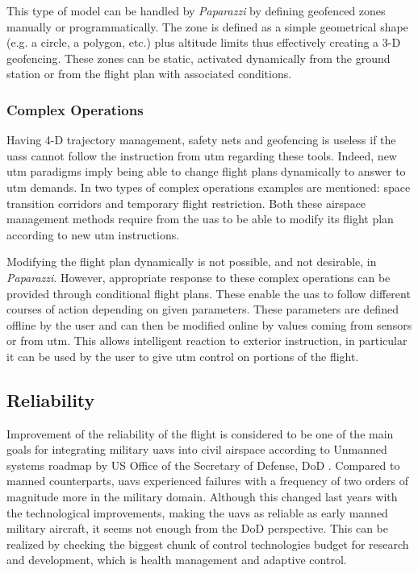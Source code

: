 		This type of model can be handled by \emph{Paparazzi} by defining geofenced zones manually or programmatically. The zone is defined as a simple geometrical shape (e.g. a circle, a polygon, etc.) plus altitude limits thus effectively creating a 3-D geofencing. 
		These zones can be static, activated dynamically from the ground station or from the flight plan with associated conditions.
	
	\subsubsection{Complex Operations}
		Having 4-D trajectory management, safety nets and geofencing is useless if the \gls{uas}s cannot follow the instruction from \gls{utm} regarding these tools.
		Indeed, new \gls{utm} paradigms imply being able to change flight plans dynamically to answer to \gls{utm} demands. In \cite{wargo_complex_2015} two types of complex operations examples are mentioned: space transition corridors and temporary flight restriction.
		Both these airspace management methods require from the \gls{uas} to be able to modify its flight plan according to new \gls{utm} instructions.
		
		Modifying the flight plan dynamically is not possible, and not desirable, in \emph{Paparazzi}. However, appropriate response to these complex operations can be provided through conditional flight plans. These enable the \gls{uas} to follow different courses of action depending on given parameters. These parameters are defined offline by the user and can then be modified online by values coming from sensors or from \gls{utm}. This allows intelligent reaction to exterior instruction, in particular it can be used by the user to give \gls{utm} control on portions of the flight.
		
\subsection{Reliability}

Improvement of the reliability of the flight is considered to be one of the main goals for integrating military \gls{uav}s into civil airspace according to Unmanned systems roadmap by US Office of the Secretary of Defense, DoD \cite{UnmannedSystemsRoadmapDoD}. Compared to manned counterparts, \gls{uav}s experienced failures with a frequency of two orders of magnitude more in the military domain.  Although this changed last years with the technological improvements, making the \gls{uav}s as reliable as early manned military aircraft, it seems not enough from the DoD perspective. This can be realized by checking the biggest chunk of control technologies budget for research and development, which is health management and adaptive control.

